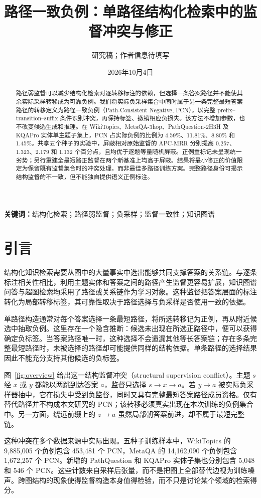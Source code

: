\documentclass[UTF8,a4paper,10pt,fontset=fandol]{ctexart}
\title{路径一致负例：单路径结构化检索中的监督冲突与修正}
\author{研究稿；作者信息待填写}
\date{2026年10月4日}
\begin{document}
\maketitle

\begin{abstract}
路径弱监督可以减少结构化检索对逐转移标注的依赖，但选择一条答案路径并不能使其余实际采样转移成为可靠负例。我们将实际负采样集合中同时属于另一条完整最短答案路径的转移定义为路径一致负例（Path-Consistent Negative, PCN），以完整 prefix--transition--suffix 条件识别冲突，再保持标签、撤销相应负损失。该方法不增加参数，也不改变候选生成和推理。在 WikiTopics、MetaQA-3hop、PathQuestion-2H3H 及 KQAPro 实体单主题子集上，PCN 占实际负例的比例为 4.59\%、11.81\%、8.80\% 和 1.45\%。共享五个种子的实验中，屏蔽相对原始监督的 APC-MRR 分别提高 0.257、1.323、2.179 和 1.132 个百分点，且均优于逐题等量随机屏蔽。正例重标记未呈现统一劣势；另行重建全最短路正监督在两个新基准上均高于屏蔽。结果将最小修正的价值限定为保留既有监督集合时的冲突处理，而非最佳多路径训练方案。完整路径身份可揭示结构监督的不一致，但不能独自提供语义正例标注。
\end{abstract}
\noindent\textbf{关键词：}结构化检索；路径弱监督；负采样；监督一致性；知识图谱

\section{引言}
结构化知识检索需要从图中的大量事实中选出能够共同支撑答案的关系链。与逐条标注相关性相比，利用主题实体和答案之间的路径产生监督更容易扩展，知识图谱问答与超图检索均采用了路径或关系链作为学习对象\cite{metaqa,pq,hyperrag}。这种监督把答案层面的标注转化为局部转移标签，其可靠性取决于路径选择与负采样是否使用一致的依据。

单路径构造通常对每个答案选择一条最短路径，将所选转移记为正例，再从附近候选中抽取负例。这里存在一个隐含推断：候选未出现在所选正路径中，便可以获得确定负标签。当答案路径唯一时，这种选择不会遗漏其他等长答案链；存在多条完整最短路径时，未被选择的路径却可能提供同样的结构依据。单条路径的选择结果因此不能充分支持其他候选的负标签。

图~\ref{fig:overview} 给出这一结构监督冲突（structural supervision conflict）。主题 $s$ 经 $x$ 或 $y$ 都能以两跳到达答案 $a$，监督只选择 $s\to x\to a$。若 $y\to a$ 被实际负采样器抽中，它在损失中受到负监督，同时又具有完整最短答案路径成员资格。仅有替代路径并不构成本文研究的 PCN；该转移必须真实出现在本次训练的负例集合中。另一方面，绕远前缀上的 $z\to a$ 虽然局部朝答案前进，却不属于最短完整链。

这种冲突在多个数据来源中实际出现。五种子训练样本中，WikiTopics 的 9,885,005 个负例包含 453,481 个 PCN，MetaQA 的 14,162,090 个负例包含 1,672,257 个 PCN。新增的 PathQuestion 和 KQAPro 实体子集也分别包含 5,048 和 546 个 PCN。这些计数来自采样后张量，而不是把图上全部替代边视为训练噪声。跨图结构的现象使得监督构造本身值得检验，而不只是讨论某个领域的检索得分。
\end{document}
